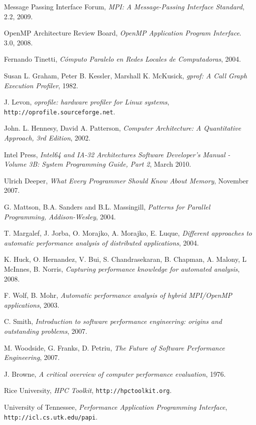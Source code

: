 \documentclass[a4paper,twocolumn]{article}
\begin{document}
\begin{thebibliography}{9}
  
  Message Passing Interface Forum,
  \emph{MPI: A Message-Passing Interface Standard},
  2.2,
  2009.

  OpenMP Architecture Review Board,
  \emph{OpenMP Application Program Interface}.
  3.0,
  2008.

  Fernando Tinetti,
  \emph{C\'omputo Paralelo en Redes Locales de Computadoras},
  2004.

 Susan L. Graham,  Peter B. Kessler,  Marshall K. McKusick,
 \emph{gprof: A Call Graph Execution Profiler},
 1982.

J. Levon,
\emph{oprofile: hardware profiler for Linux systems},
{\tt http://oprofile.sourceforge.net}.

 John. L. Hennesy, David A. Patterson,
 \emph{Computer Architecture: A Quantitative Approach, 3rd Edition},
 2002.

 Intel Press,
 \emph{Intel64 and IA-32 Architectures Software Developer's Manual - Volume 3B: System Programming Guide, Part 2},
 March 2010.

 Ulrich Deeper,
 \emph{What Every Programmer Should Know About Memory},
 November 2007.

 G. Mattson, B.A. Sanders and B.L. Massingill, 
 \emph{Patterns for Parallel Programming, Addison-Wesley},
 2004.

 T. Margalef, J. Jorba, O. Morajko, A. Morajko, E. Luque,
 \emph{Different approaches to automatic performance analysis of distributed applications},
 2004.

 K. Huck, O. Hernandez, V. Bui, S. Chandrasekaran, B. Chapman, A. Malony, L McInnes, B. Norris,
 \emph{Capturing performance knowledge for automated analysis},
 2008.

 F. Wolf, B. Mohr,
 \emph{Automatic performance analysis of hybrid MPI/OpenMP applications},
 2003.

 C. Smith,
 \emph{Introduction to software performance engineering: origins and outstanding problems},
 2007.

 M. Woodside, G. Franks, D. Petriu,
 \emph{The Future of Software Performance Engineering},
 2007.

 J. Browne,
 \emph{A critical overview of computer performance evaluation},
 1976.

  Rice University,
 \emph{HPC Toolkit},
 {\tt http://hpctoolkit.org}.

  University of Tennessee,
  \emph{Performance Application Programming Interface},
  {\tt http://icl.cs.utk.edu/papi}.


\end{thebibliography}
\end{document}
